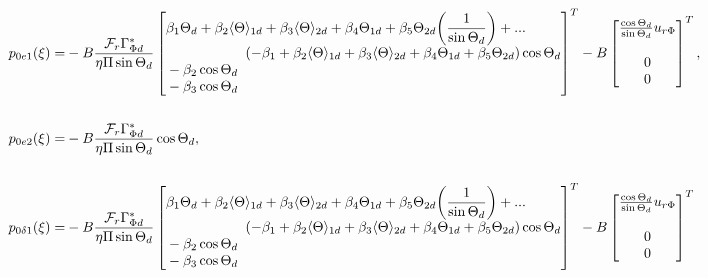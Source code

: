 \documentclass[../main.tex]{subfiles}
\begin{document}
	\begin{align}
		p_{0e1}(\xi) =& -B\frac{\mathcal{F}_r \Gamma_{\Phi d}^*}{\eta \Pi \sin \Theta_d} \begin{bmatrix} \begin{aligned}
		&\beta_1 \Theta_d  + \beta_2 \langle \Theta \rangle_{1d}  + \beta_3 \langle \Theta \rangle_{2d} + \beta_4 \Theta_{1d} + \beta_5 \Theta_{2d} \bigg(\frac{1}{\sin \Theta_d}\bigg) +...\\ 
		 &\kern2cm (-\beta_1 + \beta_2 \langle \Theta \rangle_{1d}  + \beta_3 \langle \Theta \rangle_{2d} + \beta_4 \Theta_{1d} + \beta_5 \Theta_{2d})\cos \Theta_d \\
		&-\beta_2 \cos \Theta_d \\
		&-\beta_3 \cos \Theta_d\end{aligned}\end{bmatrix}^T  - B\begin{bmatrix}\frac{\cos \Theta_d}{\sin \Theta_d}u_{r\Phi} \\\\0 \\0 \end{bmatrix}^T, \nonumber \\
		\nonumber\\
		p_{0e2}(\xi) =& -B\frac{\mathcal{F}_r \Gamma_{\Phi d}^*}{\eta \Pi \sin \Theta_d}\cos \Theta_d, \nonumber \\
		\nonumber \\
		p_{0\delta 1}(\xi)  =&  -B\frac{\mathcal{F}_r \Gamma_{\Phi d}^*}{\eta \Pi \sin \Theta_d} \begin{bmatrix} \begin{aligned}
		&\beta_1 \Theta_d  + \beta_2 \langle \Theta \rangle_{1d}  + \beta_3 \langle \Theta \rangle_{2d} + \beta_4 \Theta_{1d} + \beta_5 \Theta_{2d} \bigg(\frac{1}{\sin \Theta_d}\bigg) +...\\ 
		&\kern2cm (-\beta_1 + \beta_2 \langle \Theta \rangle_{1d}  + \beta_3 \langle \Theta \rangle_{2d} + \beta_4 \Theta_{1d} + \beta_5 \Theta_{2d})\cos \Theta_d \\
		&-\beta_2 \cos \Theta_d \\
		&-\beta_3 \cos \Theta_d\end{aligned}\end{bmatrix}^T	- B\begin{bmatrix}\frac{\cos \Theta_d}{\sin \Theta_d}u_{r\Phi} \\\\0\\0 \end{bmatrix}^T	\nonumber \\

\end{align}
\end{document}
